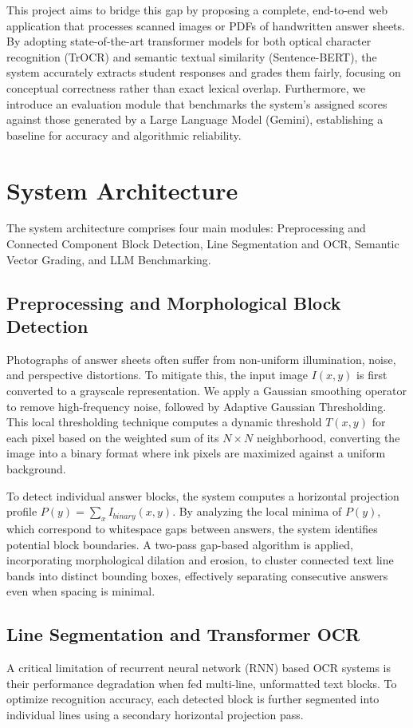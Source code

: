 \documentclass[conference]{IEEEtran}
\begin{document}
This project aims to bridge this gap by proposing a complete, end-to-end web application that processes scanned images or PDFs of handwritten answer sheets. By adopting state-of-the-art transformer models for both optical character recognition (TrOCR) and semantic textual similarity (Sentence-BERT), the system accurately extracts student responses and grades them fairly, focusing on conceptual correctness rather than exact lexical overlap. Furthermore, we introduce an evaluation module that benchmarks the system's assigned scores against those generated by a Large Language Model (Gemini), establishing a baseline for accuracy and algorithmic reliability.

\section{System Architecture}
The system architecture comprises four main modules: Preprocessing and Connected Component Block Detection, Line Segmentation and OCR, Semantic Vector Grading, and LLM Benchmarking.

\subsection{Preprocessing and Morphological Block Detection}
Photographs of answer sheets often suffer from non-uniform illumination, noise, and perspective distortions. To mitigate this, the input image $I(x,y)$ is first converted to a grayscale representation. We apply a Gaussian smoothing operator to remove high-frequency noise, followed by Adaptive Gaussian Thresholding. This local thresholding technique computes a dynamic threshold $T(x,y)$ for each pixel based on the weighted sum of its $N \times N$ neighborhood, converting the image into a binary format where ink pixels are maximized against a uniform background.

To detect individual answer blocks, the system computes a horizontal projection profile $P(y) = \sum_{x} I_{binary}(x,y)$. By analyzing the local minima of $P(y)$, which correspond to whitespace gaps between answers, the system identifies potential block boundaries. A two-pass gap-based algorithm is applied, incorporating morphological dilation and erosion, to cluster connected text line bands into distinct bounding boxes, effectively separating consecutive answers even when spacing is minimal.

\subsection{Line Segmentation and Transformer OCR}
A critical limitation of recurrent neural network (RNN) based OCR systems is their performance degradation when fed multi-line, unformatted text blocks. To optimize recognition accuracy, each detected block is further segmented into individual lines using a secondary horizontal projection pass. 
\end{document}
